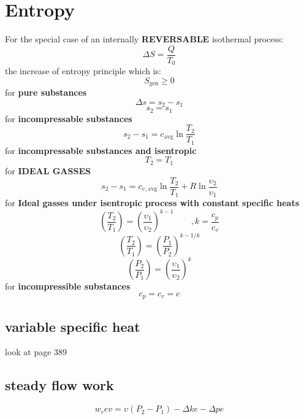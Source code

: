 \documentclass[14pt]{article}
\begin{document}
\section{Entropy}
For the special case of an internally \textbf{REVERSABLE} isothermal process:
\begin{equation}
   \Delta S = \frac{Q}{T_0}
\end{equation}
the increase of entropy principle which is:\begin{equation}
   S_{\text{gen}} \geq 0
\end{equation}
for \textbf{pure substances} \begin{equation}
   \Delta s = s_2 - s_1
\end{equation}
\begin{equation}
   s_2 = s_1
\end{equation}
for \textbf{incompressable substances}
\begin{equation}
   s_2 - s_1 = c_{\text{avg}} \ln{\frac{T_2}{T_1}}
\end{equation}
for \textbf{incompressable substances and isentropic}\begin{equation}
   T_2 = T_1
\end{equation}
for \textbf{IDEAL GASSES}
\begin{equation}
   s_2 - s_1 = c_{\upsilon , \text{avg}} \ln{\frac{T_2}{T_1}} + R\ln{\frac{\upsilon _2}{\upsilon _1}}
\end{equation}
for \textbf{Ideal gasses under isentropic process with constant specific heats}
\begin{equation}
   \left( \frac{T_2}{T_1} \right) = \left( \frac{\upsilon _1}{\upsilon _2} \right)^{k - 1} \qquad, k = \frac{c_p}{c_v}
\end{equation}
\begin{equation}
   \left( \frac{T_2}{T_1} \right) = \left( \frac{P_1}{P_2} \right)^{k - 1/k}
\end{equation}
\begin{equation}
   \left( \frac{P_2}{P_1} \right) = \left( \frac{\upsilon _1}{\upsilon _2} \right)^k
\end{equation}
for \textbf{incompressible substances} \begin{equation}
   c_p = c_v = c
\end{equation}
\subsection{variable specific heat}
look at page 389
\subsection{steady flow work}
\begin{equation}
   w_rev = \upsilon \left( P_2 - P_1 \right) - \Delta ke - \Delta pe
\end{equation}
\end{document}
